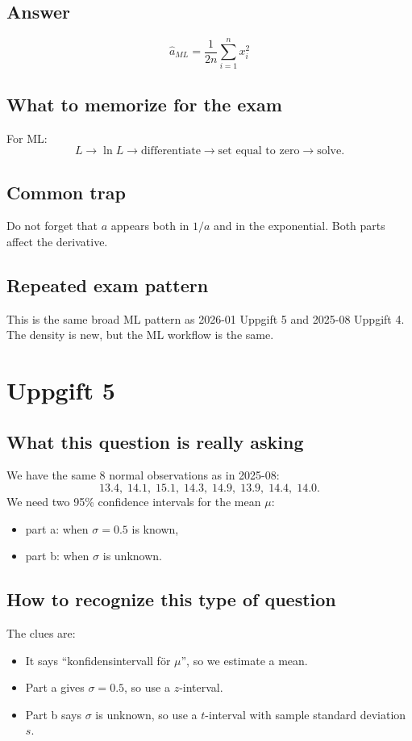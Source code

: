 \documentclass[11pt,a4paper]{article}
\begin{document}
\subsection*{Answer}
\[
\boxed{\hat a_{ML}=\frac{1}{2n}\sum_{i=1}^n x_i^2}
\]

\subsection*{What to memorize for the exam}
For ML:
\[
L \rightarrow \ln L \rightarrow \text{differentiate} \rightarrow \text{set equal to zero} \rightarrow \text{solve}.
\]

\subsection*{Common trap}
Do not forget that \(a\) appears both in \(1/a\) and in the exponential. Both parts affect the derivative.

\subsection*{Repeated exam pattern}
This is the same broad ML pattern as 2026-01 Uppgift 5 and 2025-08 Uppgift 4. The density is new, but the ML workflow is the same.

\section*{Uppgift 5}

\subsection*{What this question is really asking}
We have the same 8 normal observations as in 2025-08:
\[
13.4,\;14.1,\;15.1,\;14.3,\;14.9,\;13.9,\;14.4,\;14.0.
\]
We need two 95\% confidence intervals for the mean \(\mu\):
\begin{itemize}[leftmargin=*]
    \item part a: when \(\sigma=0.5\) is known,
    \item part b: when \(\sigma\) is unknown.
\end{itemize}

\subsection*{How to recognize this type of question}
The clues are:
\begin{itemize}[leftmargin=*]
    \item It says ``konfidensintervall för \(\mu\)'', so we estimate a mean.
    \item Part a gives \(\sigma=0.5\), so use a \(z\)-interval.
    \item Part b says \(\sigma\) is unknown, so use a \(t\)-interval with sample standard deviation \(s\).
\end{itemize}
\end{document}
